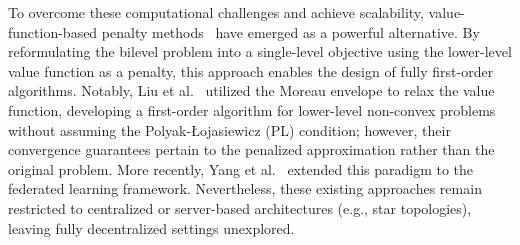 \documentclass{article}
\theoremstyle{plain}
\theoremstyle{definition}
\theoremstyle{remark}
\begin{document}
To overcome these computational challenges and achieve scalability, value-function-based penalty methods~\cite{shenfo2023, pmlr-v202-kwon23c,lufo2024,chennear2025,ji2025FO} have emerged as a powerful alternative. By reformulating the bilevel problem into a single-level objective using the lower-level value function as a penalty, this approach enables the design of fully first-order algorithms. Notably, Liu et al.~ utilized the Moreau envelope to relax the value function, developing a first-order algorithm for lower-level non-convex problems without assuming the Polyak-\L{}ojasiewicz (PL) condition; however, their convergence guarantees pertain to the penalized approximation rather than the original problem. More recently, Yang et al.~ extended this paradigm to the federated learning framework. Nevertheless, these existing approaches remain restricted to centralized or server-based architectures (e.g., star topologies), leaving fully decentralized settings unexplored.
\end{document}

